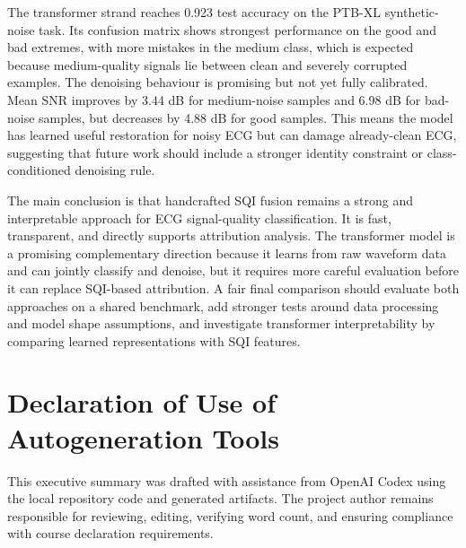 \documentclass[11pt,a4paper]{article}
\begin{document}
The transformer strand reaches 0.923 test accuracy on the PTB-XL synthetic-noise task. Its confusion matrix shows strongest performance on the good and bad extremes, with more mistakes in the medium class, which is expected because medium-quality signals lie between clean and severely corrupted examples. The denoising behaviour is promising but not yet fully calibrated. Mean SNR improves by 3.44 dB for medium-noise samples and 6.98 dB for bad-noise samples, but decreases by 4.88 dB for good samples. This means the model has learned useful restoration for noisy ECG but can damage already-clean ECG, suggesting that future work should include a stronger identity constraint or class-conditioned denoising rule.

The main conclusion is that handcrafted SQI fusion remains a strong and interpretable approach for ECG signal-quality classification. It is fast, transparent, and directly supports attribution analysis. The transformer model is a promising complementary direction because it learns from raw waveform data and can jointly classify and denoise, but it requires more careful evaluation before it can replace SQI-based attribution. A fair final comparison should evaluate both approaches on a shared benchmark, add stronger tests around data processing and model shape assumptions, and investigate transformer interpretability by comparing learned representations with SQI features.

\section*{Declaration of Use of Autogeneration Tools}

This executive summary was drafted with assistance from OpenAI Codex using the local repository code and generated artifacts. The project author remains responsible for reviewing, editing, verifying word count, and ensuring compliance with course declaration requirements.
\end{document}
